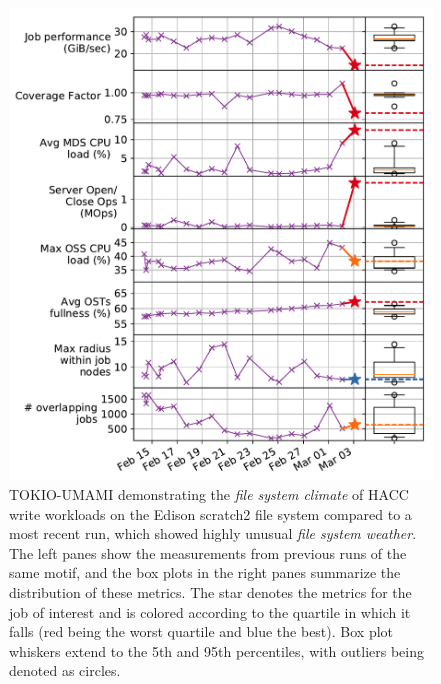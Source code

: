\begin{figure}[t]
    \centering
    \includegraphics[width=1.0\columnwidth]{figs/umami-scratch2-hacc-write.pdf}
    \caption{TOKIO-UMAMI demonstrating the \emph{file system climate} of HACC write workloads on the Edison scratch2 file system compared to a most recent run, which showed highly unusual \emph{file system weather}.
    The left panes show the measurements from previous runs of the same motif, and the box plots in the right panes summarize the distribution of these metrics.
    The star denotes the metrics for the job of interest and is colored according to the quartile in which it falls (red being the worst quartile and blue the best).
    Box plot whiskers extend to the 5th and 95th percentiles, with outliers being denoted as circles.}
    \label{fig:umami-scratch2-hacc-write}
\vspace{-.2in}
\end{figure}

